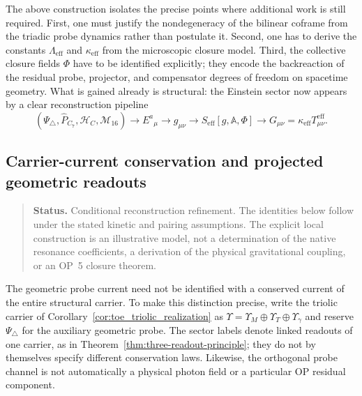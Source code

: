 \begin{remark}
The above construction isolates the precise points where additional work is
still required.
First, one must justify the nondegeneracy of the bilinear coframe from the
triadic probe dynamics rather than postulate it.
Second, one has to derive the constants $\Lambda_{\mathrm{eff}}$ and
$\kappa_{\mathrm{eff}}$ from the microscopic closure model.
Third, the collective closure fields $\Phi$ have to be identified explicitly;
they encode the backreaction of the residual probe, projector, and compensator
degrees of freedom on spacetime geometry.
What is gained already is structural: the Einstein sector now appears by a
clear reconstruction pipeline
\[
  (\Psi_\triangle,\hat P_{C_7},\mathcal H_C,\mathcal M_{16})
  \longrightarrow E^a{}_{\mu}
  \longrightarrow g_{\mu\nu}
  \longrightarrow S_{\mathrm{eff}}[g,\mathbb A,\Phi]
  \longrightarrow G_{\mu\nu}=\kappa_{\mathrm{eff}}T_{\mu\nu}^{\mathrm{eff}}.
\]
\end{remark}

\subsection*{Carrier-current conservation and projected geometric readouts}
\label{subsec:carrier-current-geometric-readout}

\begin{quote}\small
\noindent\textbf{Status.} Conditional reconstruction refinement.
The identities below follow under the stated kinetic and pairing
assumptions. The explicit local construction is an illustrative model,
not a determination of the native resonance coefficients, a derivation
of the physical gravitational coupling, or an OP~5 closure theorem.
\end{quote}

The geometric probe current need not be identified with a conserved
current of the entire structural carrier. To make this distinction
precise, write the triolic carrier of
Corollary~\ref{cor:toe_triolic_realization} as
$\Upsilon=\Upsilon_M\oplus\Upsilon_T\oplus\Upsilon_\gamma$ and
reserve $\Psi_\triangle$ for the auxiliary geometric probe. The sector
labels denote linked readouts of one carrier, as in
Theorem~\ref{thm:three-readout-principle}; they do not by themselves
specify different conservation laws. Likewise, the orthogonal probe
channel is not automatically a physical photon field or a particular
OP residual component.

